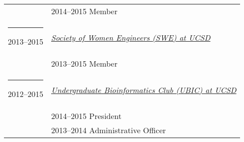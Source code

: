 \documentclass[margin,line]{res}
\begin{document}
\begin{resume}
\begin{longtable}{@{}p{0.7in}p{4in}}
\hspace*{-4mm} & \hspace{4mm} 2014--2015 Member\\
\hspace*{-4mm} \rule{-1mm}{5mm} 2013--2015 & \href{http://swe.ucsd.edu/}{\textit{Society of Women Engineers (SWE) at UCSD}}\\*
\hspace*{-4mm} & \hspace{4mm} 2013--2015 Member\\
\hspace*{-4mm} \rule{-1mm}{5mm} 2012--2015 & \href{http://ubicucsd.github.io/}{\textit{Undergraduate Bioinformatics Club (UBIC) at UCSD}}\\*
\hspace*{-4mm} & \hspace{4mm} 2014--2015 President\\*
\hspace*{-4mm} & \hspace{4mm} 2013--2014 Administrative Officer\\
\end{longtable}

\end{resume}
\end{document}
